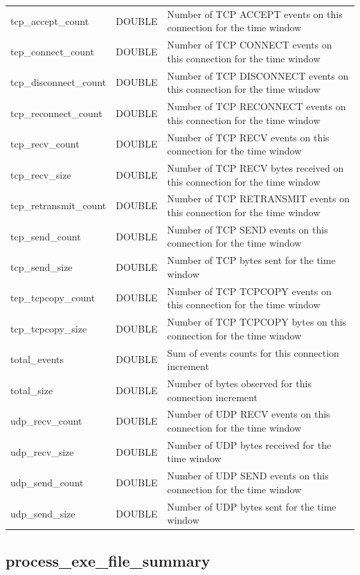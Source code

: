 \documentclass[conference,compsoc]{IEEEtran}
\begin{document}
\begin{longtable}{|p{5cm}|p{2cm}|p{9cm}|}
tcp\_accept\_count & DOUBLE & Number of TCP ACCEPT events on this connection for the time window \\
tcp\_connect\_count & DOUBLE & Number of TCP CONNECT events on this connection for the time window \\
tcp\_disconnect\_count & DOUBLE & Number of TCP DISCONNECT events on this connection for the time window \\
tcp\_reconnect\_count & DOUBLE & Number of TCP RECONNECT events on this connection for the time window \\
tcp\_recv\_count & DOUBLE & Number of TCP RECV events on this connection for the time window \\
tcp\_recv\_size & DOUBLE & Number of TCP RECV bytes received on this connection for the time window \\
tcp\_retransmit\_count & DOUBLE & Number of TCP RETRANSMIT events on this connection for the time window \\
tcp\_send\_count & DOUBLE & Number of TCP SEND events on this connection for the time window \\
tcp\_send\_size & DOUBLE & Number of TCP bytes sent for the time window \\
tcp\_tcpcopy\_count & DOUBLE & Number of TCP TCPCOPY events on this connection for the time window \\
tcp\_tcpcopy\_size & DOUBLE & Number of TCP TCPCOPY bytes on this connection for the time window \\
total\_events & DOUBLE & Sum of events counts for this connection increment \\
total\_size & DOUBLE & Number of bytes observed for this connection increment \\
udp\_recv\_count & DOUBLE & Number of UDP RECV events on this connection for the time window \\
udp\_recv\_size & DOUBLE & Number of UDP bytes received for the time window \\
udp\_send\_count & DOUBLE & Number of UDP SEND events on this connection for the time window \\
udp\_send\_size & DOUBLE & Number of UDP bytes sent for the time window \\
\hline
\end{longtable}

\subsection{process\_exe\_file\_summary}
\label{sec:process_exe_file_summary}
\end{document}
